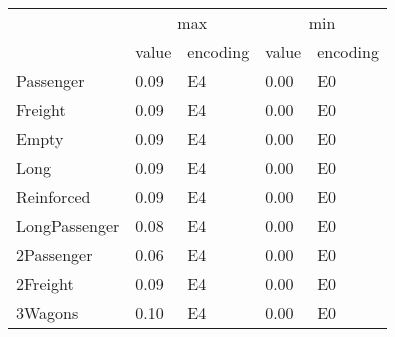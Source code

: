 \begin{tabular}{lllll}
\toprule
 & \multicolumn{2}{c}{max} & \multicolumn{2}{c}{min} \\
 & value & encoding & value & encoding \\
\midrule
Passenger & 0.09 & E4 & 0.00 & E0 \\
Freight & 0.09 & E4 & 0.00 & E0 \\
Empty & 0.09 & E4 & 0.00 & E0 \\
Long & 0.09 & E4 & 0.00 & E0 \\
Reinforced & 0.09 & E4 & 0.00 & E0 \\
LongPassenger & 0.08 & E4 & 0.00 & E0 \\
2Passenger & 0.06 & E4 & 0.00 & E0 \\
2Freight & 0.09 & E4 & 0.00 & E0 \\
3Wagons & 0.10 & E4 & 0.00 & E0 \\
\bottomrule
\end{tabular}
